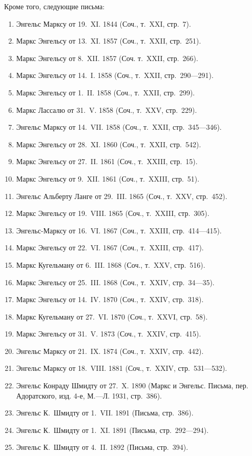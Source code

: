 Кроме того, следующие письма:
\begin{enumerate}
\item Энгельс Марксу от 19.~XI. 1844 (Соч., т.~XXI, стр.~7).
\item Маркс Энгельсу от 13.~XI. 1857 (Соч., т.~XXII, стр.~251).
\item Маркс Энгельсу от 8.~XII. 1857 (Соч. т.~XXII, стр.~266).
\item Маркс Энгельсу от 14.~I. 1858 (Соч., т.~XXII, стр.~290---291).
\item Маркс Энгельсу от 1.~II. 1858 (Соч., т.~XXII, стр.~299).
\item Маркс Лассалю от 31.~V. 1858 (Соч., т.~XXV, стр.~229).
\item Энгельс Марксу от 14.~VII. 1858 (Соч., т.~XXII, стр.~345---346).
\item Маркс Энгельсу от 28.~XI. 1860 (Соч., т.~XXII, стр.~542).
\item Маркс Энгельсу от 27.~II. 1861 (Соч., т.~XXIII, стр.~15).
\item Маркс Энгельсу от 9.~XII. 1861 (Соч., т.~XXIII, стр.~51).
\item Энгельс Альберту Ланге от 29.~III. 1865 (Соч., т.~XXV, стр.~452).
\item Маркс Энгельсу от 19.~VIII. 1865 (Соч., т.~XXIII, стр.~305).
\item Энгельс-Марксу от 16.~VI. 1867 (Соч., т.~XXIII, стр.~414---415).
\item Маркс Энгельсу от 22.~VI. 1867 (Соч., т.~XXIII, стр.~417).
\item Маркс Кугельману от 6.~III. 1868 (Соч., т.~XXV, стр.~516).
\item Маркс Энгельсу от 25.~III. 1868 (Соч., т.~XXIV, стр.~34---35).
\item Маркс Энгельсу от 14.~IV. 1870 (Соч., т.~XXIV, стр.~318).
\item Маркс Кугельману от 27.~VI. 1870 (Соч., т.~XXVI, стр.~58).
\item Маркс Энгельсу от 31.~V. 1873 (Соч., т.~XXIV, стр.~415).
\item Энгельс Марксу от 21.~IX. 1874 (Соч., т.~XXIV, стр.~442).
\item Энгельс Марксу от 18.~VIII. 1881 (Соч., т.~XXIV, стр.~531---532).
\item Энгельс Конраду Шмидту от 27.~X. 1890 (Маркс и Энгельс. Письма,
пер. Адоратского, изд. 4-е, М.---Л. 1931, стр.~386).
\item Энгельс К.~Шмидту от 1.~VII. 1891 (Письма, стр.~386).
\item Энгельс К.~Шмидту от 1.~XI. 1891 (Письма, стр.~292---294).
\item Энгельс К.~Шмидту от 4.~II. 1892 (Письма, стр.~394).
\end{enumerate}

